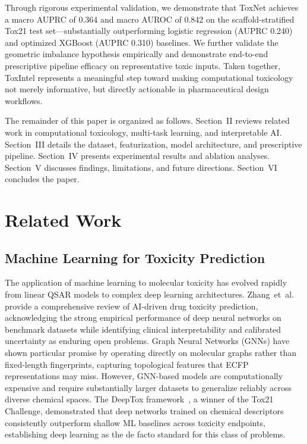 \documentclass[lettersize,journal]{IEEEtran}
\begin{document}
  Through rigorous experimental validation, we demonstrate that ToxNet achieves
  a macro AUPRC of 0.364 and macro AUROC of 0.842 on the scaffold-stratified
  Tox21 test set---substantially outperforming logistic regression (AUPRC 0.240)
  and optimized XGBoost (AUPRC 0.310) baselines.
  We further validate the geometric imbalance hypothesis empirically and
  demonstrate end-to-end prescriptive pipeline efficacy on representative toxic
  inputs.
  Taken together, ToxIntel represents a meaningful step toward making
  computational toxicology not merely informative, but directly actionable in
  pharmaceutical design workflows.

  The remainder of this paper is organized as follows.
  Section~II reviews related work in computational toxicology, multi-task
  learning, and interpretable AI.
  Section~III details the dataset, featurization, model architecture, and
  prescriptive pipeline.
  Section~IV presents experimental results and ablation analyses.
  Section~V discusses findings, limitations, and future directions.
  Section~VI concludes the paper.

  \section{Related Work}

  \subsection{Machine Learning for Toxicity Prediction}
  The application of machine learning to molecular toxicity has evolved rapidly
  from linear QSAR models to complex deep learning architectures.
  Zhang~et~al.~\cite{zhang2025} provide a comprehensive review of AI-driven drug
  toxicity prediction, acknowledging the strong empirical performance of deep
  neural networks on benchmark datasets while identifying clinical interpretability
  and calibrated uncertainty as enduring open problems.
  Graph Neural Networks (GNNs) have shown particular promise by operating
  directly on molecular graphs rather than fixed-length fingerprints, capturing
  topological features that ECFP representations may miss.
  However, GNN-based models are computationally expensive and require substantially
  larger datasets to generalize reliably across diverse chemical spaces.
  The DeepTox framework~\cite{mayr2016deeptox}, a winner of the Tox21 Challenge,
  demonstrated that deep networks trained on chemical descriptors consistently
  outperform shallow ML baselines across toxicity endpoints, establishing deep
  learning as the de facto standard for this class of problems.
\end{document}
